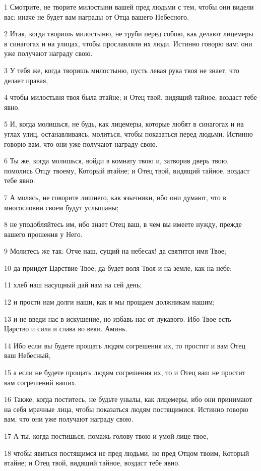 \par 1 Смотрите, не творите милостыни вашей пред людьми с тем, чтобы они видели вас: иначе не будет вам награды от Отца вашего Небесного.
\par 2 Итак, когда творишь милостыню, не труби перед собою, как делают лицемеры в синагогах и на улицах, чтобы прославляли их люди. Истинно говорю вам: они уже получают награду свою.
\par 3 У тебя же, когда творишь милостыню, пусть левая рука твоя не знает, что делает правая,
\par 4 чтобы милостыня твоя была втайне; и Отец твой, видящий тайное, воздаст тебе явно.
\par 5 И, когда молишься, не будь, как лицемеры, которые любят в синагогах и на углах улиц, останавливаясь, молиться, чтобы показаться перед людьми. Истинно говорю вам, что они уже получают награду свою.
\par 6 Ты же, когда молишься, войди в комнату твою и, затворив дверь твою, помолись Отцу твоему, Который втайне; и Отец твой, видящий тайное, воздаст тебе явно.
\par 7 А молясь, не говорите лишнего, как язычники, ибо они думают, что в многословии своем будут услышаны;
\par 8 не уподобляйтесь им, ибо знает Отец ваш, в чем вы имеете нужду, прежде вашего прошения у Него.
\par 9 Молитесь же так: Отче наш, сущий на небесах! да святится имя Твое;
\par 10 да приидет Царствие Твое; да будет воля Твоя и на земле, как на небе;
\par 11 хлеб наш насущный дай нам на сей день;
\par 12 и прости нам долги наши, как и мы прощаем должникам нашим;
\par 13 и не введи нас в искушение, но избавь нас от лукавого. Ибо Твое есть Царство и сила и слава во веки. Аминь.
\par 14 Ибо если вы будете прощать людям согрешения их, то простит и вам Отец ваш Небесный,
\par 15 а если не будете прощать людям согрешения их, то и Отец ваш не простит вам согрешений ваших.
\par 16 Также, когда поститесь, не будьте унылы, как лицемеры, ибо они принимают на себя мрачные лица, чтобы показаться людям постящимися. Истинно говорю вам, что они уже получают награду свою.
\par 17 А ты, когда постишься, помажь голову твою и умой лице твое,
\par 18 чтобы явиться постящимся не пред людьми, но пред Отцом твоим, Который втайне; и Отец твой, видящий тайное, воздаст тебе явно.
